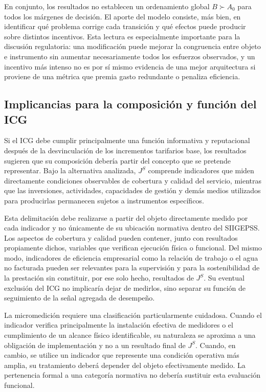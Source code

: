 En conjunto, los resultados no establecen un ordenamiento global \(B\succ A_{0}\) para todos los márgenes de decisión. El aporte del modelo consiste, más bien, en identificar qué problema corrige cada transición y qué efectos puede producir sobre distintos incentivos. Esta lectura es especialmente importante para la discusión regulatoria: una modificación puede mejorar la congruencia entre objeto e instrumento sin aumentar necesariamente todos los esfuerzos observados, y un incentivo más intenso no es por sí mismo evidencia de una mejor arquitectura si proviene de una métrica que premia gasto redundante o penaliza eficiencia.


\subsection{Implicancias para la composición y función del ICG}
\label{subsec:implicancias_icg}

Si el ICG debe cumplir principalmente una función informativa y reputacional después de la desvinculación de los incrementos tarifarios base, los resultados sugieren que su composición debería partir del concepto que se pretende representar. Bajo la alternativa analizada, \(J^{S}\) comprende indicadores que miden directamente condiciones observables de cobertura y calidad del servicio, mientras que las inversiones, actividades, capacidades de gestión y demás medios utilizados para producirlas permanecen sujetos a instrumentos específicos.

Esta delimitación debe realizarse a partir del objeto directamente medido por cada indicador y no únicamente de su ubicación normativa dentro del SIIGEPSS. Los aspectos de cobertura y calidad pueden contener, junto con resultados propiamente dichos, variables que verifican ejecución física o funcional. Del mismo modo, indicadores de eficiencia empresarial como la relación de trabajo o el agua no facturada pueden ser relevantes para la supervisión y para la sostenibilidad de la prestación sin constituir, por ese solo hecho, resultados de \(J^{S}\). Su eventual exclusión del ICG no implicaría dejar de medirlos, sino separar su función de seguimiento de la señal agregada de desempeño.

La micromedición requiere una clasificación particularmente cuidadosa. Cuando el indicador verifica principalmente la instalación efectiva de medidores o el cumplimiento de un alcance físico identificable, su naturaleza se aproxima a una obligación de implementación y no a un resultado final de \(J^{S}\). Cuando, en cambio, se utilice un indicador que represente una condición operativa más amplia, su tratamiento deberá depender del objeto efectivamente medido. La pertenencia formal a una categoría normativa no debería sustituir esta evaluación funcional.

